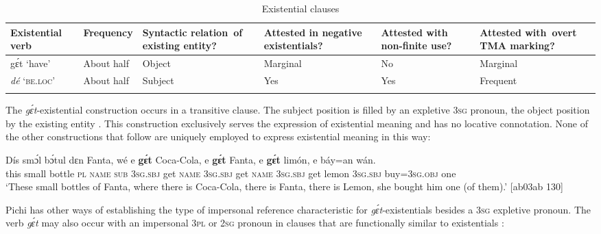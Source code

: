 \begin{table}
\caption{Existential clauses}
\label{tab:key:7.9}

\begin{tabularx}{\textwidth}{p{18mm}lQp{18mm}QQ}
\lsptoprule

Existential verb & Frequency & Syntactic \mbox{relation of} existing entity? & Attested in negative \mbox{existentials?} & Attested with non-finite use? & Attested \mbox{with overt} TMA marking?\\
\midrule
gɛ́t ‘have’ & About half & Object & Marginal & No & Marginal\\
\textit{dé} {\textsc{‘be.loc’}} & About half & Subject & Yes & Yes & Frequent\\
\lspbottomrule
\end{tabularx}
\end{table}

The \textit{gɛ́t}-existential construction occurs in a transitive clause. The subject position is filled by an expletive \textsc{3sg} pronoun, the object position by the existing entity . This construction exclusively serves the expression of existential meaning and has no locative connotation. None of the other constructions that follow are uniquely employed to express existential meaning in this way:


\ea%
    \label{ex:key:804}
    \gll Dís  smɔ́l  bɔ́tul  dɛn  Fanta,  wé  e    \textbf{gɛ́t}  Coca-Cola, e
\textbf{gɛ́t}  Fanta,  e    \textbf{gɛ́t}  limón,  e    báy=an    wán.\\
this  small  bottle  \textsc{pl}  \textsc{name}  \textsc{sub}  \textsc{3sg.sbj}  get  \textsc{name}    \textsc{3sg.sbj}
get  \textsc{name}  \textsc{3sg.sbj}  get  lemon  \textsc{3sg.sbj}  buy=\textsc{3sg.obj}  one\\

\glt ‘These small bottles of Fanta, where there is Coca-Cola, there is Fanta, there is 
Lemon, she bought him one (of them).’ [ab03ab 130]
\z

Pichi has other ways of establishing the type of impersonal reference characteristic for \textit{gɛ́t}-existentials besides a \textsc{3sg} expletive pronoun{\fff}. The verb \textit{gɛ́t} may also occur with an impersonal \textsc{3pl}  or \textsc{2sg}  pronoun in clauses that are functionally similar to existentials :{\fff}


